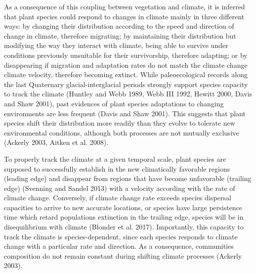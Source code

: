 \documentclass[11pt,twoside]{reedthesis}
\begin{document}
As a consequence of this coupling between vegetation and climate, it is
inferred that plant species could respond to changes in climate mainly
in three different ways: by changing their distribution according to the
speed and direction of change in climate, therefore migrating; by
maintaining their distribution but modifying the way they interact with
climate, being able to survive under conditions previously unsuitable
for their survivorship, therefore adapting; or by disappearing if
migration and adaptation rates do not match the climate change climate
velocity, therefore becoming extinct. While paleoecological records
along the last Quaternary glacial-interglacial periods strongly support
species capacity to track the climate (Huntley and Webb 1989, Webb III
1992, Hewitt 2000, Davis and Shaw 2001), past evidences of plant species
adaptations to changing environments are less frequent (Davis and Shaw
2001). This suggests that plant species shift their distribution more
readily than they evolve to tolerate new environmental conditions,
although both processes are not mutually exclusive (Ackerly 2003, Aitken
et al. 2008).\par

To properly track the climate at a given temporal scale, plant species
are supposed to successfully establish in the new climatically favorable
regions (leading edge) and disappear from regions that have become
unfavorable (trailing edge) (Svenning and Sandel 2013) with a velocity
according with the rate of climate change. Conversely, if climate change
rate exceeds species dispersal capacities to arrive to new accurate
locations, or species have large persistence time which retard
populations extinction in the trailing edge, species will be in
disequilibrium with climate (Blonder et al. 2017). Importantly, this
capacity to track the climate is species-dependent, since each species
responds to climate change with a particular rate and direction. As a
consequence, communities composition do not remain constant during
shifting climate processes (Ackerly 2003).\par
\end{document}

